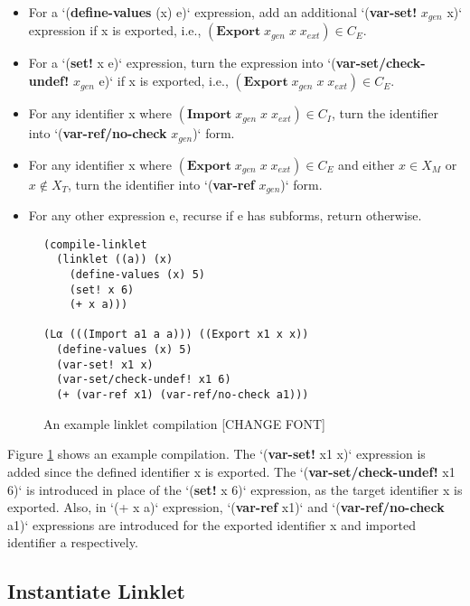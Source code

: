 \documentclass[sigplan,screen,anonymous]{acmart}
\begin{document}
\begin{itemize}
 \item For a `(\textbf{define-values} (x) e)` expression, add an
   additional `(\textbf{var-set!} $x_{gen}$ x)` expression if x is exported,
   i.e., $(\textbf{Export}\; x_{gen}\; x\; x_{ext}) \in \mathit{C_E}$.
 \item For a `(\textbf{set!} x e)` expression, turn the expression into
   `(\textbf{var-set/check-undef!} $x_{gen}$ e)` if x is exported,
   i.e., $(\textbf{Export}\; x_{gen}\; x\; x_{ext}) \in \mathit{C_E}$.
 \item For any identifier x where $(\textbf{Import}\; x_{gen}\; x\; x_{ext}) \in
   \mathit{C_I}$, turn the identifier into `(\textbf{var-ref/no-check}
   $x_{gen}$)` form.
  \item For any identifier x where $(\textbf{Export}\; x_{gen}\; x\; x_{ext}) \in
    \mathit{C_E}$ and either $x \in \mathit{X_M}$ or $x \notin \mathit{X_T}$,
    turn the identifier into `(\textbf{var-ref} $x_{gen}$)` form.
  \item For any other expression e, recurse if e has subforms, return
    otherwise.
\end{itemize}

\begin{figure}[h]
\begin{verbatim}
(compile-linklet
  (linklet ((a)) (x)
    (define-values (x) 5)
    (set! x 6)
    (+ x a)))

(Lα (((Import a1 a a))) ((Export x1 x x))
  (define-values (x) 5)
  (var-set! x1 x)
  (var-set/check-undef! x1 6)
  (+ (var-ref x1) (var-ref/no-check a1)))
\end{verbatim}
\caption{An example linklet compilation [CHANGE FONT]}
\label{fig:compile-example}
\end{figure}

Figure \ref{fig:compile-example} shows an example compilation. The
`(\textbf{var-set!} x1 x)` expression is added since the defined
identifier x is exported. The `(\textbf{var-set/check-undef!} x1 6)`
is introduced in place of the `(\textbf{set!} x 6)` expression, as the
target identifier x is exported. Also, in `(+ x a)` expression,
`(\textbf{var-ref} x1)` and `(\textbf{var-ref/no-check} a1)`
expressions are introduced for the exported identifier x and imported
identifier a respectively.


\subsection{Instantiate Linklet}
\label{sec:instantiate}
\end{document}
